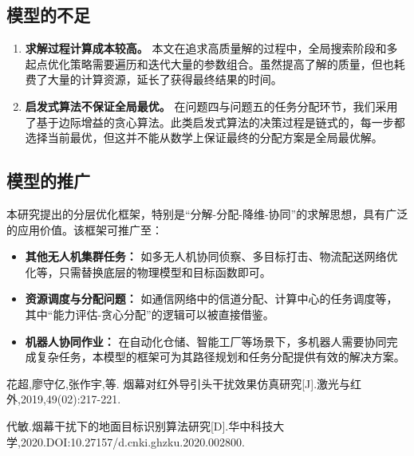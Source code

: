 \documentclass[12pt]{article}
\begin{document}
\begin{CJK}{UTF8}{gbsn}
		\subsection{模型的不足}
		\begin{enumerate}
			\item \textbf{求解过程计算成本较高。} 本文在追求高质量解的过程中，全局搜索阶段和多起点优化策略需要遍历和迭代大量的参数组合。虽然提高了解的质量，但也耗费了大量的计算资源，延长了获得最终结果的时间。
			
			\item \textbf{启发式算法不保证全局最优。} 在问题四与问题五的任务分配环节，我们采用了基于边际增益的贪心算法。此类启发式算法的决策过程是链式的，每一步都选择当前最优，但这并不能从数学上保证最终的分配方案是全局最优解。
			
		\end{enumerate}
		
		\subsection{模型的推广}
		本研究提出的分层优化框架，特别是“分解-分配-降维-协同”的求解思想，具有广泛的应用价值。该框架可推广至：
		\begin{itemize}
			\item \textbf{其他无人机集群任务：} 如多无人机协同侦察、多目标打击、物流配送网络优化等，只需替换底层的物理模型和目标函数即可。
			\item \textbf{资源调度与分配问题：} 如通信网络中的信道分配、计算中心的任务调度等，其中“能力评估-贪心分配”的逻辑可以被直接借鉴。
			\item \textbf{机器人协同作业：} 在自动化仓储、智能工厂等场景下，多机器人需要协同完成复杂任务，本模型的框架可为其路径规划和任务分配提供有效的解决方案。
		\end{itemize}
		
		
		
		\newpage
		
		
		\begin{thebibliography}{99}
			

			 花超,廖守亿,张作宇,等. 烟幕对红外导引头干扰效果仿真研究[J].激光与红外,2019,49(02):217-221.
			
			 代敏.烟幕干扰下的地面目标识别算法研究[D].华中科技大学,2020.DOI:10.27157/d.cnki.ghzku.2020.002800.
			
		\end{thebibliography}
		
		\clearpage
		

\end{CJK}
\end{document}
